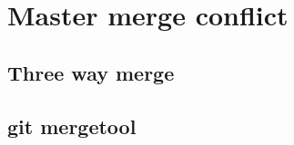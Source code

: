\section{Master merge conflict}
\begin{frame}[fragile]
    \slidetitle
\end{frame}

\subsection{Three way merge}
\begin{frame}[fragile]
    \subslidetitle
\end{frame}

\subsection{git mergetool}
\begin{frame}[fragile]
    \subslidetitle
\end{frame}

